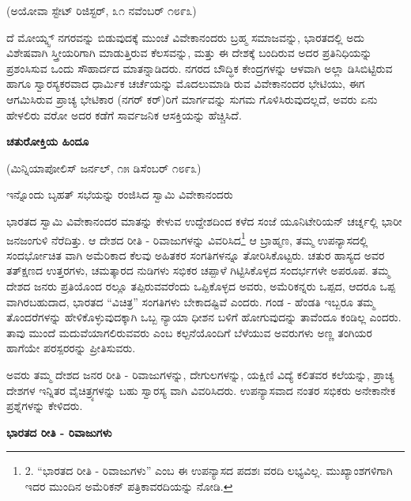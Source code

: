 \begin{center}
(ಅಯೋವಾ ಸ್ಟೇಟ್ ರಿಜಿಸ್ಟರ್, ೩೧ ನವೆಂಬರ್ ೧೮೯೩)
\end{center}

ದೆ ಮೋಯ್ನ್ಸ್ ನಗರವನ್ನು ಬಿಡುವುದಕ್ಕೆ ಮುಂಚೆ ವಿವೇಕಾನಂದರು ಬ್ರಹ್ಮ ಸಮಾಜವನ್ನು, ಭಾರತದಲ್ಲಿ ಅದು ವಿಶೇಷವಾಗಿ ಸ್ತ್ರೀಯರಿಗಾಗಿ ಮಾಡುತ್ತಿರುವ ಕೆಲಸವನ್ನು, ಮತ್ತು ಈ ದೇಶಕ್ಕೆ ಬಂದಿರುವ ಅದರ ಪ್ರತಿನಿಧಿಯನ್ನು ಪ್ರಶಂಸಿಸುವ ಒಂದು ಸೌಹಾರ್ದದ ಮಾತನ್ನಾಡಿದರು. ನಗರದ ಬೌದ್ಧಿಕ ಕೇಂದ್ರಗಳನ್ನು ಆಳವಾಗಿ ಅಲ್ಲಾ ಡಿಸಿಬಿಟ್ಟಿರುವ ಹಾಗೂ ಸ್ವಾರಸ್ಯಕರವಾದ ಧಾರ್ಮಿಕ ಚರ್ಚೆಯನ್ನು ಮೊದಲುಮಾಡಿ ರುವ ವಿವೇಕಾನಂದರ ಭೇಟಿಯು, ಈಗ ಆಗಮಿಸಿರುವ ಪ್ರಾಚ್ಯ ಭೇಟಿಕಾರ (ನಗರ್ ಕರ್)ರಿಗೆ ಮಾರ್ಗವನ್ನು ಸುಗಮ ಗೊಳಿಸಿರುವುದಲ್ಲದೆ, ಅವರು ಏನು ಹೇಳಲಿರು ವರೋ ಅದರ ಕಡೆಗೆ ಸಾರ್ವಜನಿಕ ಆಸಕ್ತಿಯನ್ನು ಹೆಚ್ಚಿಸಿದೆ.

\begin{center}
\textbf{ಚತುರೋಕ್ತಿಯ ಹಿಂದೂ}
\end{center}

\begin{center}
(ಮಿನ್ನಿಯಾಪೋಲಿಸ್ ಜರ್ನಲ್, ೧೫ ಡಿಸೆಂಬರ್ ೧೮೯೩)
\end{center}

\begin{center}
ಇನ್ನೊಂದು ಬೃಹತ್ ಸಭೆಯನ್ನು ರಂಜಿಸಿದ ಸ್ವಾಮಿ ವಿವೇಕಾನಂದರು
\end{center}

ಭಾರತದ ಸ್ವಾಮಿ ವಿವೇಕಾನಂದರ ಮಾತನ್ನು ಕೇಳುವ ಉದ್ದೇಶದಿಂದ ಕಳೆದ ಸಂಜೆ ಯೂನಿಟೇರಿಯನ್ ಚರ್ಚ್ನಲ್ಲಿ ಭಾರೀ ಜನಜಂಗುಳಿ ನೆರೆದಿತ್ತು. ಆ ದೇಶದ ರೀತಿ - ರಿವಾಜುಗಳನ್ನು ವಿವರಿಸಿದ\footnote{2. “ಭಾರತದ ರೀತಿ - ರಿವಾಜುಗಳು” ಎಂಬ ಈ ಉಪನ್ಯಾಸದ ಪದಶಃ ವರದಿ ಲಭ್ಯವಿಲ್ಲ. ಮುಖ್ಯಾಂಶಗಳಿಗಾಗಿ ಇದರ ಮುಂದಿನ ಅಮೆರಿಕನ್ ಪತ್ರಿಕಾವರದಿಯನ್ನು ನೋಡಿ.} ಆ ಬ್ರಾಹ್ಮಣ, ತಮ್ಮ ಉಪನ್ಯಾಸದಲ್ಲಿ ಸಂದರ್ಭೋಚಿತ ವಾಗಿ ಅಮೆರಿಕಾದ ಕೆಲವು ಅಹಿತಕರ ಸಂಗತಿಗಳನ್ನೂ ತೋರಿಸಿಕೊಟ್ಟರು. ಚತುರ ಹಾಸ್ಯದ ಅವರ ತತ್ಕ್ಷಣದ ಉತ್ತರಗಳು, ಚಮತ್ಕಾರದ ನುಡಿಗಳು ಸಭಿಕರ ಚಪ್ಪಾಳೆ ಗಿಟ್ಟಿಸಿಕೊಳ್ಳದ ಸಂದರ್ಭಗಳೇ ಅಪರೂಪ. ತಮ್ಮ ದೇಶದ ಜನರು ಪ್ರತಿಯೊಂದ ರಲ್ಲೂ ತಪ್ಪಿರುವವರೆಂದು ಒಪ್ಪಿಕೊಳ್ಳದ ಅವರು, ಅಮೆರಿಕನ್ನರು ಒಪ್ಪದ, ಆದರೂ ಒಪ್ಪ ವಾಗಿರಬಹುದಾದ, ಭಾರತದ “ವಿಚಿತ್ರ” ಸಂಗತಿಗಳು ಬೇಕಾದಷ್ಟಿವೆ ಎಂದರು. ಗಂಡ - ಹೆಂಡತಿ ಇಬ್ಬರೂ ತಮ್ಮ ತೊಂದರೆಗಳನ್ನು ಹೇಳಿಕೊಳ್ಳುವುದಕ್ಕಾಗಿ ಒಬ್ಬ ನ್ಯಾಯಾ ಧೀಶನ ಬಳಿಗೆ ಹೋಗುವುದನ್ನು ತಾವೆಂದೂ ಕಂಡಿಲ್ಲ ಎಂದರು. ತಾವು ಮುಂದೆ ಮದುವೆಯಾಗಲಿರುವವರು ಎಂಬ ಕಲ್ಪನೆಯೊಂದಿಗೆ ಬೆಳೆಯುವ ಅವರುಗಳು ಅಣ್ಣ ತಂಗಿಯರ ಹಾಗೆಯೇ ಪರಸ್ಪರರನ್ನು ಪ್ರೀತಿಸುವರು.

ಅವರು ತಮ್ಮ ದೇಶದ ಜನರ ರೀತಿ - ರಿವಾಜುಗಳನ್ನು, ದೇಗುಲಗಳನ್ನು, ಯಕ್ಷಿಣಿ ವಿದ್ಯೆ ಕಲಿತವರ ಕಲೆಯನ್ನು, ಪ್ರಾಚ್ಯ ದೇಶಗಳ ಇನ್ನಿತರ ವೈಚಿತ್ರ್ಯಗಳನ್ನು ಬಹು ಸ್ವಾರಸ್ಯ ವಾಗಿ ವಿವರಿಸಿದರು. ಉಪನ್ಯಾಸವಾದ ನಂತರ ಸಭಿಕರು ಅನೇಕಾನೇಕ ಪ್ರಶ್ನೆಗಳನ್ನು ಕೇಳಿದರು.

\begin{center}
\textbf{ಭಾರತದ ರೀತಿ - ರಿವಾಜುಗಳು}
\end{center}

